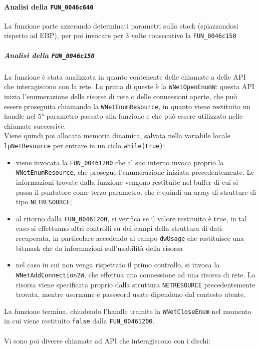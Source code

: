 \documentclass[12pt]{extarticle}
\begin{document}
\paragraph{Analisi della \texttt{FUN\_0046c640}} La funzione parte azzerando determinati parametri sullo stack (spiazzandosi rispetto ad EBP), per poi invocare per 3 volte consecutive la \texttt{FUN\_0046c150}\\

\subparagraph{Analisi della \texttt{FUN\_0046c150}} La funzione è stata analizzata in quanto contenente delle chiamate a delle API che interagiscono con la rete. La prima di queste è la \texttt{WNetOpenEnumW}: questa API inizia l'enumerazione delle risorse di rete o delle connessioni aperte, che può essere proseguita chiamando la \texttt{WNetEnumResource}, in quanto viene restituito un handle nel 5° parametro passato alla funzione e che può essere utilizzato nelle chiamate successive.\\Viene quindi poi allocata memoria dinamica, salvata nella variabile locale \texttt{lpNetResource} per entrare in un ciclo \texttt{while(true)}:
\begin{itemize}
    \item viene invocata la \texttt{FUN\_00461200} che al suo interno invoca proprio la \texttt{WNetEnumResource}, che prosegue l'enumerazione iniziata precedentemente. Le informazioni trovate dalla funzione vengono restituite nel buffer di cui si passa il puntatore come terzo parametro, che è quindi un array di strutture di tipo \texttt{NETRESOURCE};
    \item al ritorno dalla \texttt{FUN\_00461200}, si verifica se il valore restituito è true, in tal caso si effettuano altri controlli su dei campi della struttura di dati recuperata, in particolare accedendo al campo \texttt{dwUsage} che restituisce una bitmask che da informazioni sull'usabilità della risorsa
    \item nel caso in cui non venga rispettato il primo controllo, si invoca la \texttt{WNetAddConnection2W}, che effettua una connessione ad una risorsa di rete. La risorsa viene specificata proprio dalla struttura \texttt{NETRESOURCE} precedentemente trovata, mentre username e password usate dipendono dal contesto utente.
\end{itemize}
La funzione termina, chiudendo l'handle tramite la \texttt{WNetCloseEnum} nel momento in cui viene restituito \texttt{false} dalla \texttt{FUN\_00461200}.\\\\Vi sono poi diverse chiamate ad API che interagiscono con i dischi:
\end{document}
